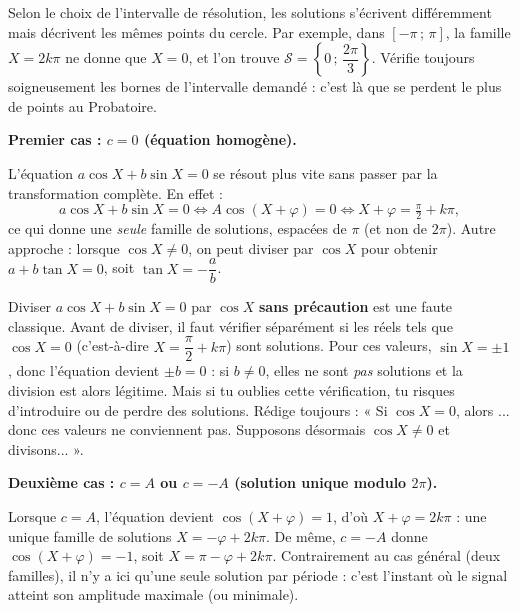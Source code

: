 \documentclass[11pt]{article}
\newcommand{\cle}[1]{{\popxbold\color{popdark}#1}}
\newcounter{popsec}
\newcounter{popsub}
\newcommand{\courssub}[1]{%
  \stepcounter{popsub}%
  \par\vspace{9pt}\noindent{\popxbold\fontsize{11.5}{13}\selectfont\color{popink}{\color{poporange}\thepopsec.\thepopsub}\hspace{6pt}#1}\par\nopagebreak\vspace{4pt}
}
\begin{document}
\begin{attention}
Selon le choix de l'intervalle de résolution, les solutions s'écrivent différemment mais décrivent les mêmes points du cercle. Par exemple, dans $[-\pi\,;\,\pi]$, la famille $X = 2k\pi$ ne donne que $X = 0$, et l'on trouve $\mathcal{S} = \left\{0\,;\,\dfrac{2\pi}{3}\right\}$. Vérifie toujours soigneusement les bornes de l'intervalle demandé : c'est là que se perdent le plus de points au Probatoire.
\end{attention}

\courssub{Cas particuliers à connaître}

\textbf{Premier cas : $c = 0$ (équation homogène).}\par
L'équation $a\cos X + b\sin X = 0$ se résout plus vite sans passer par la transformation complète. En effet :
\[ a\cos X + b\sin X = 0 \Longleftrightarrow A\cos(X+\varphi) = 0 \Longleftrightarrow X + \varphi = \tfrac{\pi}{2} + k\pi, \]
ce qui donne une \emph{seule} famille de solutions, espacées de $\pi$ (et non de $2\pi$). Autre approche : lorsque $\cos X \neq 0$, on peut diviser par $\cos X$ pour obtenir $a + b\tan X = 0$, soit $\tan X = -\dfrac{a}{b}$.

\begin{attention}
Diviser $a\cos X + b\sin X = 0$ par $\cos X$ \textbf{sans précaution} est une faute classique. Avant de diviser, il faut vérifier séparément si les réels tels que $\cos X = 0$ (c'est-à-dire $X = \dfrac{\pi}{2} + k\pi$) sont solutions. Pour ces valeurs, $\sin X = \pm 1$, donc l'équation devient $\pm b = 0$ : si $b \neq 0$, elles ne sont \emph{pas} solutions et la division est alors légitime. Mais si tu oublies cette vérification, tu risques d'introduire ou de perdre des solutions. Rédige toujours : « Si $\cos X = 0$, alors ... donc ces valeurs ne conviennent pas. Supposons désormais $\cos X \neq 0$ et divisons... ».
\end{attention}

\textbf{Deuxième cas : $c = A$ ou $c = -A$ (solution unique modulo $2\pi$).}\par
Lorsque $c = A$, l'équation devient $\cos(X+\varphi) = 1$, d'où $X + \varphi = 2k\pi$ : une \cle{unique} famille de solutions $X = -\varphi + 2k\pi$. De même, $c = -A$ donne $\cos(X+\varphi) = -1$, soit $X = \pi - \varphi + 2k\pi$. Contrairement au cas général (deux familles), il n'y a ici qu'une seule solution par période : c'est l'instant où le signal atteint son amplitude maximale (ou minimale).
\end{document}
